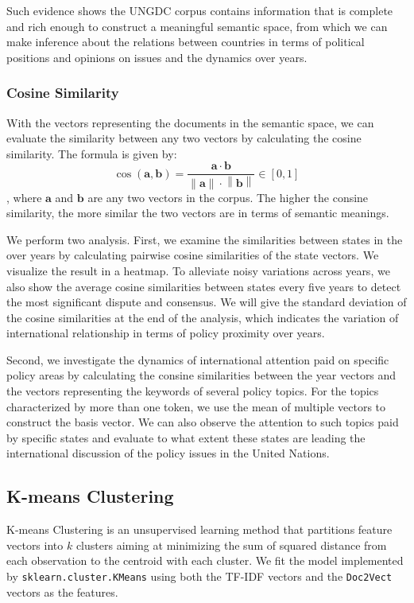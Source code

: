 \documentclass[final,authoryear,3p,12pt,times,hidelinks]{elsarticle}
\begin{document}
Such evidence shows the UNGDC corpus contains information that is complete and rich enough to construct a meaningful semantic space, from which we can make inference about the relations between countries in terms of political positions and opinions on issues and the dynamics over years. 

\subsubsection{Cosine Similarity}
\label{suc:network Cosine}
With the vectors representing the documents in the semantic space, we can evaluate the similarity between any two vectors by calculating the cosine similarity. The formula is given by: 
$$ \cos{(\bm{a}, \bm{b})} = \frac{\bm{a} \cdot \bm{b}}{\left\|\bm{a} \right\| \cdot \left\|\bm{b} \right\| } \in [0, 1]$$
, where $\bm{a}$ and $\bm{b}$ are any two vectors in the corpus. The higher the consine similarity, the more similar the two vectors are in terms of semantic meanings. 

We perform two analysis. First, we examine the similarities between states in the over years by calculating pairwise cosine similarities of the state vectors. We visualize the result in a heatmap. To alleviate noisy variations across years, we also show the average cosine similarities between states every five years to detect the most significant dispute and consensus. We will give the standard deviation of the cosine similarities at the end of the analysis, which indicates the variation of international relationship in terms of policy proximity over years. 

Second, we investigate the dynamics of international attention paid on specific policy areas by calculating the consine similarities between the year vectors and the vectors representing the keywords of several policy topics. For the topics characterized by more than one token, we use the mean of multiple vectors to construct the basis vector. We can also observe the attention to such topics paid by specific states and evaluate to what extent these states are leading the international discussion of the policy issues in the United Nations. 

\subsection{K-means Clustering}
\label{subsec:K-means Clustering}
K-means Clustering is an unsupervised learning method that partitions feature vectors into $k$ clusters aiming at minimizing the sum of squared distance from each observation to the centroid with each cluster. We fit the model implemented by \texttt{sklearn.cluster.KMeans} using both the TF-IDF vectors and the \texttt{Doc2Vect} vectors as the features. 
\end{document}
